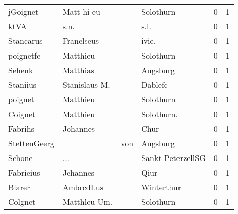 \begin{tabular}{llllrr}
                 jGoignet &                         Matt hi eu &             &                                   Solothurn &          0 &         1 \\
                     ktVA &                               s.n. &             &                                        s.l. &          0 &         1 \\
                Stancarus &                         Franelseus &             &                                      ivie.  &          0 &         1 \\
                poignetfc &                           Matthieu &             &                                   Solothurn &          0 &         1 \\
                   Sehenk &                           Matthias &             &                                    Augsburg &          0 &         1 \\
                 Staniius &                      Stanislaus M. &             &                                     Dablefc &          0 &         1 \\
                  poignet &                           Matthieu &             &                                   Solothurn &          0 &         1 \\
                  Coignet &                           Matthieu &             &                                 Solothurn.  &          0 &         1 \\
                  Fabrihs &                           Johannes &             &                                        Chur &          0 &         1 \\
             StettenGeerg &                                    &         von &                                    Augsburg &          0 &         1 \\
                   Schone &                                ... &             &                           Sankt PeterzellSG &          0 &         1 \\
                Fabrieius &                           Jehannes &             &                                        Qiur &          0 &         1 \\
                   Blarer &                          AmbrcdLus &             &                                  Winterthur &          0 &         1 \\
                  Colgnet &                       Matthleu Um. &             &                                   Solothurn &          0 &         1 \\

\end{tabular}
